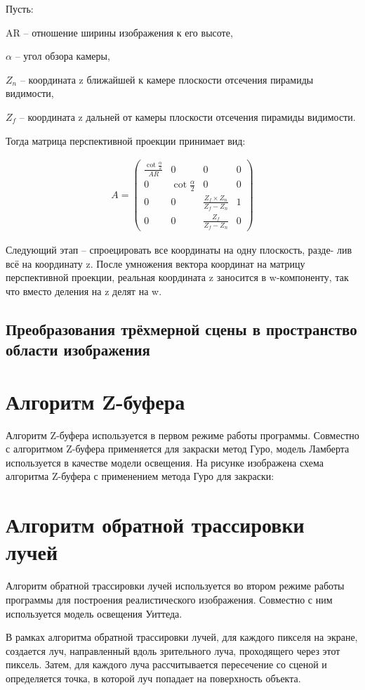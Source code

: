 Пусть: 


AR – отношение ширины изображения к его высоте, 


$\alpha$ – угол обзора камеры, 


$Z_n$ -- координата z ближайшей к камере плоскости отсечения пирамиды видимости, 


$Z_f$ -- координата z дальней от камеры плоскости отсечения пирамиды видимости. 


Тогда матрица перспективной проекции принимает вид:

\begin{align}
	A = 
	\begin{pmatrix}	
		\frac{\cot{\frac{\alpha}{2}}}{AR} & 0 & 0 & 0 \\
		0 & \cot{\frac{\alpha}{2}} & 0 & 0\\
		0 & 0 & \frac{Z_f \times Z_n}{Z_f - Z_n} & 1\\
		0 & 0 & \frac{Z_f}{Z_f - Z_n} & 0
	\end{pmatrix}
\end{align}

Следующий этап – спроецировать все координаты на одну плоскость, разде-
лив всё на координату z. После умножения вектора координат на матрицу
перспективной проекции, реальная координата z заносится в w-компоненту,
так что вместо деления на z делят на w.
\subsection{Преобразования трёхмерной сцены в пространство области изображения}
\section{Алгоритм Z-буфера}
Алгоритм Z-буфера используется в первом режиме работы программы. Совместно с алгоритмом Z-буфера применяется для закраски метод Гуро, модель Ламберта используется в качестве модели освещения.
На рисунке изображена схема алгоритма Z-буфера с применением метода Гуро для закраски:
\section{Алгоритм обратной трассировки лучей}
Алгоритм обратной трассировки лучей используется во втором режиме работы программы для построения реалистического изображения. Совместно с ним используется модель освещения Уиттеда.


В рамках алгоритма обратной трассировки лучей, для каждого пикселя на экране, создается луч, направленный вдоль зрительного луча, проходящего через этот пиксель. Затем, для каждого луча рассчитывается пересечение со сценой и определяется точка, в которой луч попадает на поверхность объекта.


